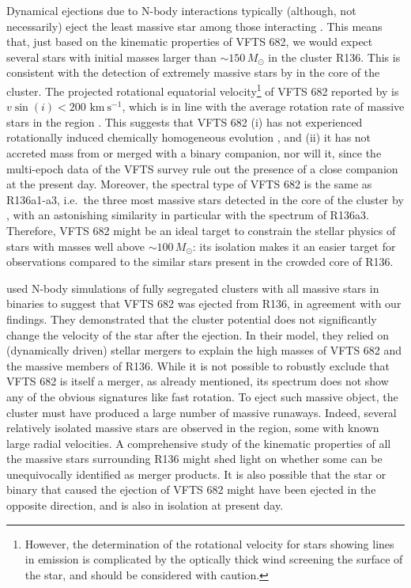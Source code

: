 \documentclass[apjl,twocolumn]{emulateapj}
\newcommand{\kms}{{\,\mathrm{km\ s^{-1}}}}
\begin{document}
Dynamical ejections due to N-body interactions typically (although, not necessarily) eject the least
massive star among those interacting \cite[e.g.,][]{banerjee:12}. This means that, just
based on the kinematic properties of VFTS 682, we would expect several
stars with initial masses larger than $\sim$$150\,M_\odot$ in the
cluster R136.
This is consistent with the detection
of extremely massive stars by \cite{crowther:10} in the core of the
cluster. The projected rotational equatorial
velocity\footnote{However, the determination of the rotational
  velocity for stars showing lines in emission is complicated by the optically thick wind screening the surface of the star, and should be
  considered with caution.} of VFTS 682
reported by \cite{schneider:18} is $v\sin(i)<200\,\kms$, which is in
line with the average rotation rate of massive stars in the region
\citep[][]{ramirez-agudelo:15}. This suggests that VFTS 682 (i) has not
experienced rotationally induced chemically homogeneous evolution
\citep[][]{maeder:00,demink:09,marchant:16}, and (ii) it has not
accreted mass from or merged with a binary companion, nor will it, since the multi-epoch
data of the VFTS survey rule out the presence of a close companion at the
present day. Moreover, the spectral type of VFTS 682
\citep[WNh5,][]{bestenlehner:11} is the same as R136a1-a3, i.e.~the
three most massive stars detected in the core of the cluster by
\cite{crowther:10}, with an astonishing similarity in particular with
the spectrum of R136a3. Therefore,
VFTS 682 might be an ideal target to constrain the stellar physics of
stars with masses well above $\sim$$100\,M_\odot$: its isolation makes
it an easier target for observations compared to the similar stars
present in the crowded core of R136.

\citet{banerjee:12} used N-body simulations of fully segregated
clusters with all massive stars in binaries to suggest that VFTS 682
was ejected from R136, in agreement with our findings. They
demonstrated that the cluster potential does not significantly change
the velocity of the star after the ejection. In their
model, they relied on (dynamically driven) stellar mergers to explain the high masses of
VFTS 682 and the massive members of R136. While it is not possible to
robustly exclude that VFTS 682 is itself a merger, as already
mentioned, its spectrum does not show any of the obvious signatures
like fast rotation. To eject such massive object, the cluster must have produced
a large number of massive runaways. Indeed, several relatively
isolated massive stars are observed in the region, some with known
large radial velocities. A comprehensive study of the kinematic
properties of all the massive stars surrounding R136 might shed light
on whether some can be unequivocally identified as merger products. It
is also possible that the star or binary that caused the ejection of
VFTS 682 might have been ejected in the opposite direction, and is also
in isolation at present day. 
\end{document}
